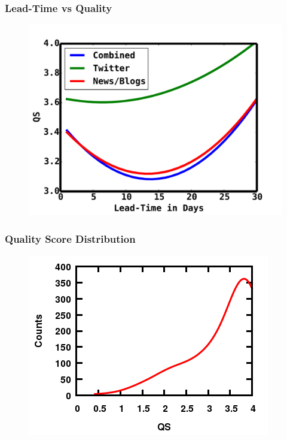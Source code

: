 \documentclass[red]{beamer}
\begin{document}
\begin{frame}
    \frametitle{Lead-Time vs Quality}
    \begin{figure}
        \includegraphics[scale=0.4]{leadTimeVsQS}
    \end{figure}
\end{frame}

\begin{frame}
    \frametitle{Quality Score Distribution}
    \centering
    \begin{figure}
        \includegraphics[scale=0.6]{doubleHump}
    \end{figure}
\end{frame}
\end{document}
